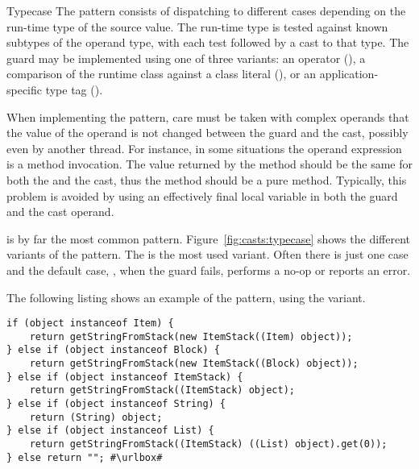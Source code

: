 \begin{pattern}{Typecase}
The \thisp{} pattern consists of dispatching to different cases
depending on the run-time type of the source value.
The run-time type is tested against known subtypes of the operand type,
with each test followed by a cast to that type.
The guard may be implemented using one of three variants:
an  operator (),
a comparison of the runtime class against a class literal (),
or an application-specific type tag ().

When implementing the pattern,
care must be taken with complex operands that the value of the operand is
not changed between the guard and the cast, possibly even by another thread.
For instance, in some situations the operand expression is a method invocation.
The value returned by the method should be the same for both the
 and the cast, thus the method should be a pure method.
Typically, this problem is avoided by using an effectively final local variable in both the guard and the cast operand.

\instances{}
\thisp{} is by far the most common pattern.
Figure~\ref{fig:casts:typecase} shows the different variants of the pattern.
The  is the most used variant.
Often there is just one case and the default case, \ie,
when the guard fails, performs a no-op or reports an error.


The following listing shows an example of the \thisp{} pattern,
using the  variant.

\def\urlvar{http://bit.ly/PenguinSquad_Enchiridion_2HnNwB7}
\begin{verbatim}
if (object instanceof Item) {
	return getStringFromStack(new ItemStack((Item) object));
} else if (object instanceof Block) {
	return getStringFromStack(new ItemStack((Block) object));
} else if (object instanceof ItemStack) {
	return getStringFromStack((ItemStack) object);
} else if (object instanceof String) {
	return (String) object;
} else if (object instanceof List) {
	return getStringFromStack((ItemStack) ((List) object).get(0));
} else return ""; #\urlbox#
\end{verbatim}


\end{pattern}
